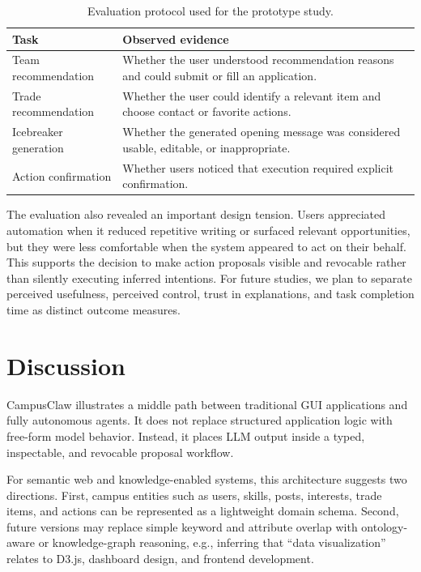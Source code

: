 \documentclass[sigconf]{acmart}
\begin{document}
\begin{table}[t]
\centering
\caption{Evaluation protocol used for the prototype study.}
\label{tab:evaluation}
\begin{tabularx}{\linewidth}{lX}
\toprule
\textbf{Task} & \textbf{Observed evidence}\\
\midrule
Team recommendation & Whether the user understood recommendation reasons and could submit or fill an application.\\
Trade recommendation & Whether the user could identify a relevant item and choose contact or favorite actions.\\
Icebreaker generation & Whether the generated opening message was considered usable, editable, or inappropriate.\\
Action confirmation & Whether users noticed that execution required explicit confirmation.\\
\bottomrule
\end{tabularx}
\end{table}

The evaluation also revealed an important design tension. Users appreciated automation when it reduced repetitive writing or surfaced relevant opportunities, but they were less comfortable when the system appeared to act on their behalf. This supports the decision to make action proposals visible and revocable rather than silently executing inferred intentions. For future studies, we plan to separate perceived usefulness, perceived control, trust in explanations, and task completion time as distinct outcome measures.

\section{Discussion}
CampusClaw illustrates a middle path between traditional GUI applications and fully autonomous agents. It does not replace structured application logic with free-form model behavior. Instead, it places LLM output inside a typed, inspectable, and revocable proposal workflow.

For semantic web and knowledge-enabled systems, this architecture suggests two directions. First, campus entities such as users, skills, posts, interests, trade items, and actions can be represented as a lightweight domain schema. Second, future versions may replace simple keyword and attribute overlap with ontology-aware or knowledge-graph reasoning, e.g., inferring that ``data visualization'' relates to D3.js, dashboard design, and frontend development.
\end{document}
